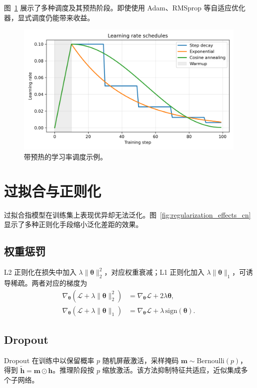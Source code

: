 ﻿\documentclass[UTF8,zihao=-4]{ctexart}
\begin{document}
图~\ref{fig:lr_schedules_cn} 展示了多种调度及其预热阶段。即使使用 Adam、RMSprop 等自适应优化器，显式调度仍能带来收益。

\begin{figure}[H]
  \centering
  \includegraphics[width=0.8\linewidth]{learning_rate_schedules.png}
  \caption{带预热的学习率调度示例。}
  \label{fig:lr_schedules_cn}
\end{figure}
\FloatBarrier

\section{过拟合与正则化}
过拟合指模型在训练集上表现优异却无法泛化。图~\ref{fig:regularization_effects_cn} 显示了多种正则化手段缩小泛化差距的效果。

\subsection{权重惩罚}
L2 正则化在损失中加入 $\lambda \|\boldsymbol{\theta}\|_2^2$，对应权重衰减；L1 正则化加入 $\lambda \|\boldsymbol{\theta}\|_1$，可诱导稀疏。两者对应的梯度为
\begin{align}
  \nabla_{\boldsymbol{\theta}} (\mathcal{L} + \lambda \|\boldsymbol{\theta}\|_2^2) &= \nabla_{\boldsymbol{\theta}} \mathcal{L} + 2\lambda \boldsymbol{\theta}, \\
  \nabla_{\boldsymbol{\theta}} (\mathcal{L} + \lambda \|\boldsymbol{\theta}\|_1) &= \nabla_{\boldsymbol{\theta}} \mathcal{L} + \lambda\, \mathrm{sign}(\boldsymbol{\theta}).
\end{align}

\subsection{Dropout}
Dropout 在训练中以保留概率 $p$ 随机屏蔽激活，采样掩码 $\mathbf{m} \sim \mathrm{Bernoulli}(p)$，得到 $\tilde{\mathbf{h}} = \mathbf{m} \odot \mathbf{h}$。推理阶段按 $p$ 缩放激活。该方法抑制特征共适应，近似集成多个子网络。
\end{document}
